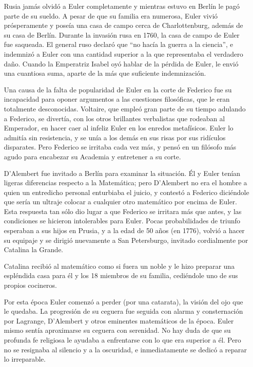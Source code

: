 \documentclass[a4paper, 12pt]{article}
\begin{document}
Rusia jamás olvidó a Euler completamente y mientras estuvo en Berlín le pagó parte de su sueldo. A pesar de que su familia era numerosa, Euler vivió prósperamente y poseía una casa de campo cerca de Charlottenburg, además de su casa de Berlín. Durante la invasión rusa en 1760, la casa de campo de Euler fue saqueada. El general ruso declaró que ``no hacía la guerra a la ciencia'', e indemnizó a Euler con una cantidad superior a la que representaba el verdadero daño. Cuando la Emperatriz Isabel oyó hablar de la pérdida de Euler, le envió una cuantiosa suma, aparte de la más que suficiente indemnización.

Una causa de la falta de popularidad de Euler en la corte de Federico fue su incapacidad para oponer argumentos a las cuestiones filosóficas, que le eran totalmente desconocidas. Voltaire, que empleó gran parte de su tiempo adulando a Federico, se divertía, con los otros brillantes verbalistas que rodeaban al Emperador, en hacer caer al infeliz Euler en los enredos metafísicos. Euler lo admitía sin resistencia, y se unía a los demás en sus risas por sus ridículos disparates. Pero Federico se irritaba cada vez más, y pensó en un filósofo más agudo para encabezar su Academia y entretener a su corte.

D'Alembert fue invitado a Berlín para examinar la situación. Él y Euler tenían ligeras diferencias respecto a la Matemática; pero D'Alembert no era el hombre a quien un entredicho personal enturbiaba el juicio, y contestó a Federico diciéndole que sería un ultraje colocar a cualquier otro matemático por encima de Euler. Esta respuesta tan sólo dio lugar a que Federico se irritara más que antes, y las condiciones se hicieron intolerables para Euler. Pocas probabilidades de triunfo esperaban a sus hijos en Prusia, y a la edad de 50 años (en 1776), volvió a hacer su equipaje y se dirigió nuevamente a San Petersburgo, invitado cordialmente por Catalina la Grande.

Catalina recibió al matemático como si fuera un noble y le hizo preparar una espléndida casa  para él y los 18 miembros de su familia, cediéndole uno de sus propios cocineros.

Por esta época Euler comenzó a perder (por una catarata), la visión del ojo que le quedaba. La progresión de su ceguera fue seguida con alarma y consternación por Lagrange, D'Alembert y otros eminentes matemáticos de la época. Euler mismo sentía aproximarse su ceguera con serenidad. No hay duda de que su profunda fe religiosa le ayudaba a enfrentarse con lo que era superior a él. Pero no se resignaba al silencio y a la oscuridad, e inmediatamente se dedicó a reparar lo irreparable.
\end{document}
